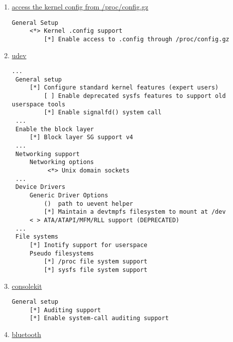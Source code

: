 \documentclass[10pt,a4paper]{article}
\begin{document}
\begin{enumerate}
                    \newpage
                    \item \href{https://wiki.gentoo.org/wiki/Kernel/IKCONFIG_Support}{access the kernel config from /proc/config.gz}
                        
                        \begin{lstlisting}[style=KernelConfig]
 General Setup 
     <*> Kernel .config support
         [*] Enable access to .config through /proc/config.gz
                        \end{lstlisting}
                    
                    \newpage
                    \item \href{https://wiki.gentoo.org/wiki/Udev#Kernel}{udev}
                        
                        \begin{lstlisting}[style=KernelConfig]
 ...
 General setup
     [*] Configure standard kernel features (expert users)
         [ ] Enable deprecated sysfs features to support old userspace tools
         [*] Enable signalfd() system call
 ...
 Enable the block layer
     [*] Block layer SG support v4
 ...
 Networking support
     Networking options
          <*> Unix domain sockets
 ...
 Device Drivers
     Generic Driver Options
         ()  path to uevent helper
         [*] Maintain a devtmpfs filesystem to mount at /dev
     < > ATA/ATAPI/MFM/RLL support (DEPRECATED)
 ...
 File systems
     [*] Inotify support for userspace
     Pseudo filesystems
         [*] /proc file system support
         [*] sysfs file system support
                        \end{lstlisting}
                    
                    \newpage
                    \item \href{https://wiki.gentoo.org/wiki/ConsoleKit#Kernel}{consolekit}
                        \begin{lstlisting}[style=KernelConfig]
 General setup
     [*] Auditing support
     [*] Enable system-call auditing support
                        \end{lstlisting}
                        
                    \newpage
                    \item \href{https://wiki.gentoo.org/wiki/Bluetooth#Kernel}{bluetooth}
                    

\end{enumerate}
\end{document}
